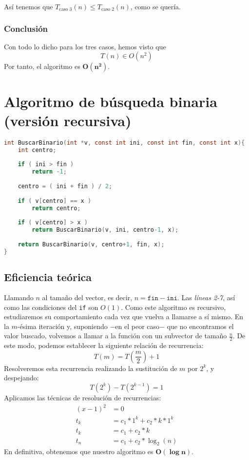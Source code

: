 \documentclass[10pt, a4paper]{article}
\theoremstyle{theorem-style}
\theoremstyle{theorem-style}
\theoremstyle{definition-style}
\theoremstyle{remark-style}
\theoremstyle{example-style}
\theoremstyle{definition-style}
\theoremstyle{remark-style}
\begin{document}
Así tenemos que $T_{\text{caso 3}}(n) \leq T_{\text{caso 2}}(n)$, como se quería.

\subsubsection*{Conclusión}

Con todo lo dicho para los tres casos, hemos visto que
$$ T(n) \in O(n^2) $$
Por tanto, el algoritmo es $\boldsymbol{O(n^2)}$.

\section{Algoritmo de búsqueda binaria (versión recursiva)}

\begin{lstlisting}[language=C]
int BuscarBinario(int *v, const int ini, const int fin, const int x){
	int centro;
	
	if ( ini > fin )
		return -1;
	
	centro = ( ini + fin ) / 2;
	
	if ( v[centro] == x )
		return centro;
	
	if ( v[centro] > x )
		return BuscarBinario(v, ini, centro-1, x);
	
	return BuscarBinario(v, centro+1, fin, x);
}
\end{lstlisting}

\subsection{Eficiencia teórica}

Llamando $n$ al tamaño del vector, es decir, $n=\texttt{fin}-\texttt{ini}$. Las \emph{líneas 2-7}, así como las condiciones del \texttt{if} son $O(1)$. Como este algoritmo es recursivo, estudiaremos su comportamiento cada vez que vuelva a llamarse a sí mismo. En la $m$-ésima iteración y, suponiendo $-$en el peor caso$-$ que no encontramos el valor buscado, volvemos a llamar a la función con un subvector de tamaño $\frac{n}{2}$. De este modo, podemos establecer la siguiente relación de recurrencia:
$$T(m) = T\left(\frac{m}{2}\right)+1$$
Resolveremos esta recurrencia realizando la sustitución de $m$ por $2^k$, y despejando:
$$T(2^k)-T(2^{k-1})=1$$
Aplicamos las técnicas de resolución de recurrencias:
\begin{align*}
(x-1)^2 &= 0\\
t_{k} &= c_{1}*1^k + c_{2}*k*1^k\\
t_{k} &= c_{1}+c_{2}*k\\
t_{n} &= c_{1}+c_{2}*\log_{2}(n)
\end{align*}
En definitiva, obtenemos que nuestro algoritmo es $\boldsymbol{O(\log n)}$.
\end{document}
